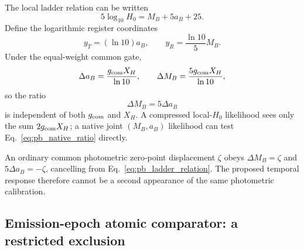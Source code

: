 \documentclass[aps,prd,twocolumn,10pt,superscriptaddress,nofootinbib]{revtex4-2}
\begin{document}
The local ladder relation can be written
\begin{equation}
5\log_{10}H_0=M_B+5a_B+25.
\label{eq:pb_ladder_relation}
\end{equation}
Define the logarithmic register coordinates
\begin{equation}
y_T=(\ln10)a_B,
\qquad
y_R=\frac{\ln10}{5}M_B.
\label{eq:pb_native_coords}
\end{equation}
Under the equal-weight common gate,
\begin{equation}
\Delta a_B=\frac{g_{\rm com}X_H}{\ln10},
\qquad
\Delta M_B=\frac{5g_{\rm com}X_H}{\ln10},
\label{eq:pb_native_shifts}
\end{equation}
so the ratio
\begin{equation}
\boxed{\Delta M_B=5\Delta a_B}
\label{eq:pb_native_ratio}
\end{equation}
is independent of both $g_{\rm com}$ and $X_H$.  A compressed local-$H_0$
likelihood sees only the sum $2g_{\rm com}X_H$; a native joint
$(M_B,a_B)$ likelihood can test Eq.~\eqref{eq:pb_native_ratio} directly.

An ordinary common photometric zero-point displacement $\zeta$ obeys
$\Delta M_B=\zeta$ and $5\Delta a_B=-\zeta$, cancelling from
Eq.~\eqref{eq:pb_ladder_relation}.  The proposed temporal response therefore
cannot be a second appearance of the same photometric calibration.

\subsection{Emission-epoch atomic comparator: a restricted exclusion}
\label{sec:emission_atomic}
\end{document}
